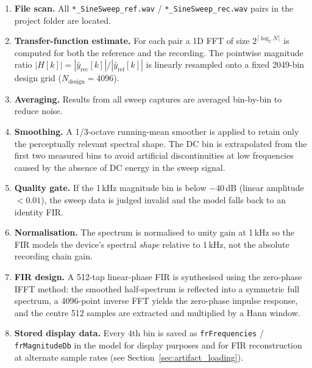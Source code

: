 \documentclass[11pt, letterpaper]{article}
\begin{document}
\begin{enumerate}
  \item \textbf{File scan.}  All \texttt{*\_SineSweep\_ref.wav} /
        \texttt{*\_SineSweep\_rec.wav} pairs in the project folder are
        located.

  \item \textbf{Transfer-function estimate.}  For each pair a 1D FFT
        of size $2^{\lceil\log_2 N\rceil}$ is computed for both the
        reference and the recording.  The pointwise magnitude ratio
        $|H[k]| = |\hat{y}_{\text{rec}}[k]| / |\hat{y}_{\text{ref}}[k]|$
        is linearly resampled onto a fixed 2049-bin design grid
        ($N_{\text{design}} = 4096$).

  \item \textbf{Averaging.}  Results from all sweep captures are
        averaged bin-by-bin to reduce noise.

  \item \textbf{Smoothing.}  A 1/3-octave running-mean smoother is
        applied to retain only the perceptually relevant spectral shape.
        The DC bin is extrapolated from the first two measured bins to
        avoid artificial discontinuities at low frequencies caused by
        the absence of DC energy in the sweep signal.

  \item \textbf{Quality gate.}  If the 1\,kHz magnitude bin is below
        $-40$\,dB (linear amplitude $< 0.01$), the sweep data is judged
        invalid and the model falls back to an identity FIR.

  \item \textbf{Normalisation.}  The spectrum is normalised to unity
        gain at 1\,kHz so the FIR models the device's spectral
        \emph{shape} relative to 1\,kHz, not the absolute recording chain gain.

  \item \textbf{FIR design.}  A 512-tap linear-phase FIR is synthesised
        using the zero-phase IFFT method: the smoothed half-spectrum is
        reflected into a symmetric full spectrum, a 4096-point inverse
        FFT yields the zero-phase impulse response, and the centre 512
        samples are extracted and multiplied by a Hann window.

  \item \textbf{Stored display data.}  Every 4th bin is saved as
        \texttt{frFrequencies} / \texttt{frMagnitudeDb} in the model for
        display purposes and for FIR reconstruction at alternate sample
        rates (see Section~\ref{sec:artifact_loading}).
\end{enumerate}
\end{document}
